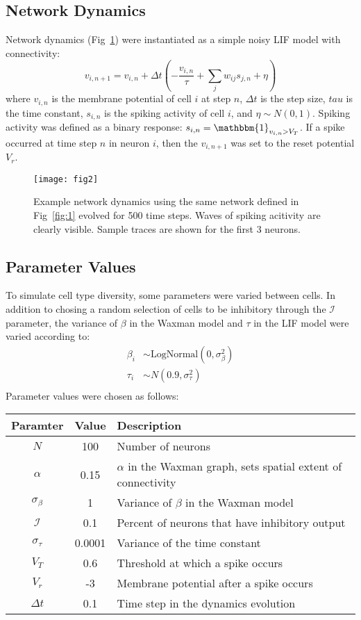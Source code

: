 \documentclass[12pt]{article}
\begin{document}
\subsection{Network Dynamics}
Network dynamics (Fig~\ref{fig:2}) were instantiated as a simple noisy LIF model with connectivity:
$$
v_{i,n+1}=v_{i,n} + \Delta t \left(-\frac{v_{i,n}}{\tau} + \sum_j w_{ij}s_{j,n} + \eta \right)
$$
where $v_{i,n}$ is the membrane potential of cell $i$ at step $n$, $\Delta t$ is the step size, $tau$ is the time constant, $s_{i,n}$ is the spiking activity of cell $i$, and $\eta \sim N(0,1)$. Spiking activity was defined as a binary response: $s_{i,n}=\mathbbm{1}_{v_{i,n}>V_T}$. If a spike occurred at time step $n$ in neuron $i$, then the $v_{i,n+1}$ was set to the reset potential $V_r$.
\begin{figure}[h]
\centering
\texttt{[image: fig2]}
\caption{Example network dynamics using the same network defined in Fig~\ref{fig:1} evolved for 500 time steps. Waves of spiking acitivity are clearly visible. Sample traces are shown for the first 3 neurons.}
\label{fig:2}
\end{figure}

\subsection{Parameter Values}
To simulate cell type diversity, some parameters were varied between cells. In addition to chosing a random selection of cells to be inhibitory through the $\mathcal{I}$ parameter, the variance of $\beta$ in the Waxman model and $\tau$ in the LIF model were varied according to:
\begin{align*}
\beta_i&\sim \mathrm{LogNormal}(0,\sigma_\beta^2)\\
\tau_i&\sim N(0.9,\sigma_\tau^2)\\
\end{align*}
Parameter values were chosen as follows:

\vspace{2mm}
\begin{tabular}{|c|c|l|}
\hline
\bf{Paramter} & \bf{Value} & \bf{Description} \\
\hline
$N$ & 100 & Number of neurons \\
$\alpha$ & 0.15 & $\alpha$ in the Waxman graph, sets spatial extent of connectivity \\
$\sigma_\beta$ & 1 & Variance of $\beta$ in the Waxman model \\
$\mathcal{I}$ & 0.1 & Percent of neurons that have inhibitory output \\
$\sigma_\tau$ & 0.0001 & Variance of the time constant \\
$V_T$ & 0.6 & Threshold at which a spike occurs \\
$V_r$ & -3 & Membrane potential after a spike occurs \\
$\Delta t$ & 0.1 & Time step in the dynamics evolution \\
\hline
\end{tabular}
\end{document}
